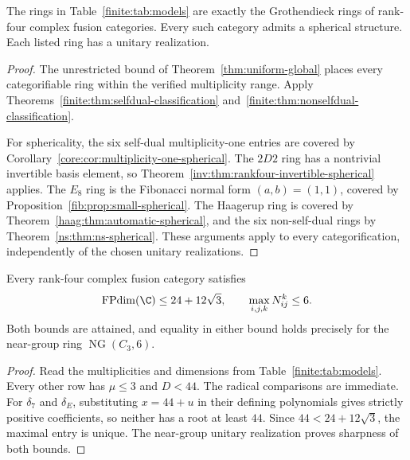 \begin{corollary}
\label{finite:cor:classification}
The rings in Table~\ref{finite:tab:models} are exactly the Grothendieck
rings of rank-four complex fusion categories.  Every such category
admits a spherical structure.  Each listed ring has a unitary realization.
\end{corollary}
\begin{proof}
The unrestricted bound of Theorem~\ref{thm:uniform-global} places every
categorifiable ring within the verified multiplicity range.  Apply
Theorems~\ref{finite:thm:selfdual-classification}
and~\ref{finite:thm:nonselfdual-classification}.

For sphericality, the six self-dual multiplicity-one entries are
covered by Corollary~\ref{core:cor:multiplicity-one-spherical}.
The $2D2$ ring has a nontrivial invertible basis element, so
Theorem~\ref{inv:thm:rankfour-invertible-spherical} applies.
The $E_8$ ring is the Fibonacci normal form $(a,b)=(1,1)$, covered
by Proposition~\ref{fib:prop:small-spherical}. The Haagerup ring
is covered by Theorem~\ref{haag:thm:automatic-spherical}, and the
six non-self-dual rings by Theorem~\ref{ns:thm:ns-spherical}.
These arguments apply to every categorification, independently of the
chosen unitary realizations.
\end{proof}

\begin{corollary}\label{finite:cor:sharp-bounds}
Every rank-four complex fusion category satisfies
\[
\operatorname{FPdim}(\C)\leq24+12\sqrt3,
\qquad \max_{i,j,k}N_{ij}^k\leq6.
\]
Both bounds are attained, and equality in either bound holds precisely
for the near-group ring $\operatorname{NG}(C_3,6)$.
\end{corollary}
\begin{proof}
Read the multiplicities and dimensions from Table~\ref{finite:tab:models}.
Every other row has $\mu\le3$ and $D<44$. The radical comparisons are
immediate. For $\delta_7$ and $\delta_E$, substituting $x=44+u$ in their
defining polynomials gives strictly positive coefficients, so neither has
a root at least $44$. Since $44<24+12\sqrt3$, the maximal entry is unique.
The near-group unitary realization proves sharpness of both bounds.
\end{proof}

